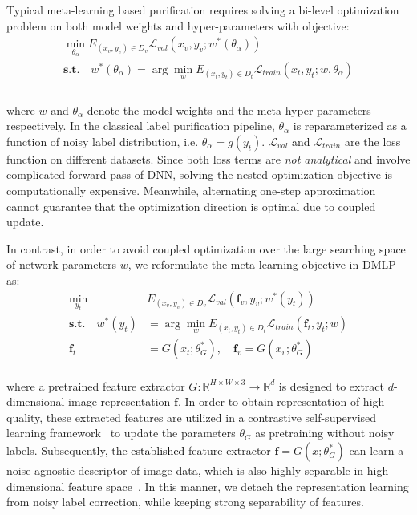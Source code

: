 \documentclass[10pt,twocolumn,letterpaper]{article}
\newcommand{\zbsN}[1]{\textcolor{black}{#1}}
\begin{document}
{Typical meta-learning based purification requires solving a bi-level optimization problem on both model weights and hyper-parameters with objective:}
\begin{equation}
\label{meta-objective}
\begin{gathered}
\min_{\theta_{\alpha}} E_{(x_v, y_v) \in D_v}\mathcal{L}_{val}(x_v, y_v; w^*(\theta_{\alpha})) \\
\textbf{s.t.}  \quad
w^{*}(\theta_{\alpha})=\arg \min _{w} E_{(x_t, y_t) \in D_t}\mathcal{L}_{train}(x_t, y_t; w, \theta_{\alpha}) \\
\end{gathered}
\end{equation} \\
where $w$ and $\theta_{\alpha}$ denote the model weights and the {meta hyper-parameters} respectively. {In the classical label purification pipeline, $\theta_{\alpha}$ is reparameterized as a function of noisy label distribution, i.e. $\theta_{\alpha}=g(y_t)$}. $\mathcal{L}_{val}$ and $\mathcal{L}_{train}$ are the loss function on different datasets. 
{Since both loss terms are \emph{not analytical} and involve complicated forward pass of DNN, solving the nested optimization objective is computationally expensive. Meanwhile, alternating one-step approximation~\cite{Learning-to-Reweight,AAAI-2021-meta} cannot guarantee that the optimization direction is optimal due to coupled update.}

{In contrast, in order to avoid coupled optimization over the large searching space of network parameters $w$, we reformulate the meta-learning objective in DMLP as:}
\begin{equation}
\label{eq:meta-objective-label}
\begin{aligned}
\min_{y_t} & E_{(x_v, y_v) \in D_v}\mathcal{L}_{val}(\mathbf{f}_v, y_v; w^*(y_t)) \\
\textbf{s.t.}  \quad
w^{*}(y_t) & =\arg \min _{w} E_{(x_t, y_t) \in D_t}\mathcal{L}_{train}(\mathbf{f}_t, y_t; w) \\
\mathbf{f}_t & = G(x_t;\theta^*_{G}), \quad \mathbf{f}_v = G(x_v;\theta^*_{G})
\end{aligned}
\end{equation} \\
where a pretrained feature extractor $G:\mathbb{R}^{H\times W\times 3}\rightarrow\mathbb{R}^d$ is designed to extract $d$-dimensional image representation $\mathbf{f}$. In order to obtain representation of high quality, these extracted features are utilized in a {contrastive} self-supervised learning {framework}~\cite{chen2020simple,2020MoCo-v2} to update the parameters $\theta_{G}$ as pretraining without noisy labels. Subsequently, the \zbsN{established} feature extractor $\mathbf{f}=G(x;\theta^*_G)$ can learn a noise-agnostic descriptor of image data, which is also highly separable in high dimensional feature space~\cite{zhang2020decoupling}. In this manner, we detach the representation learning from noisy label correction, while keeping strong separability of features.
\end{document}
